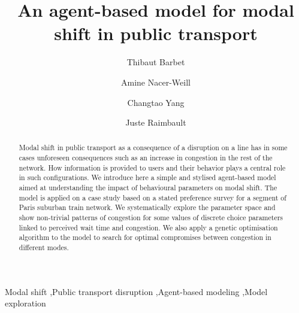 \documentclass[3p,times,procedia]{elsarticle}
\begin{document}
\begin{frontmatter}


\title{An agent-based model for modal shift in public transport}

\author[a]{Thibaut Barbet}
\author[a]{Amine Nacer-Weill}
\author[a]{Changtao Yang}
\author[b]{Juste Raimbault}

\address[a]{Ecole des Ponts ParisTech, Champs-sur-Marne, France}
\address[b]{CASA, University College London, London, United Kingdom}







\begin{abstract}
Modal shift in public transport as a consequence of a disruption on a line has in some cases unforeseen consequences such as an increase in congestion in the rest of the network. How information is provided to users and their behavior plays a central role in such configurations. We introduce here a simple and stylised agent-based model aimed at understanding the impact of behavioural parameters on modal shift. The model is applied on a case study based on a stated preference survey for a segment of Paris suburban train network. We systematically explore the parameter space and show non-trivial patterns of congestion for some values of discrete choice parameters linked to perceived wait time and congestion. We also apply a genetic optimisation algorithm to the model to search for optimal compromises between congestion in different modes.
\end{abstract}

\begin{keyword}
Modal shift \sep Public transport disruption \sep Agent-based modeling \sep Model exploration
\end{keyword}
\end{frontmatter}
\end{document}
